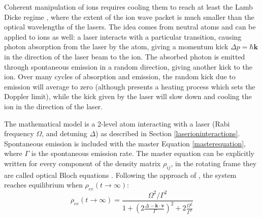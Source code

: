 Coherent manipulation of ions requires cooling them to reach at least the Lamb Dicke regime \cite{Wineland1998}, where the extent of the ion wave packet is much smaller than the optical wavelengths of the lasers. The idea comes from neutral atoms \cite{1975OptCo..13...68H} and can be applied to ions as well: a laser interacts with a particular transition, causing photon absorption from the laser by the atom, giving a momentum kick $\Delta p = \hbar \mathbf{k}$ in the direction of the laser beam to the ion. The absorbed photon is emitted through spontaneous emission in a random direction, giving another kick to the ion. Over many cycles of absorption and emission, the random kick due to emission will average to zero (although presents a heating process which sets the Doppler limit), while the kick given by the laser will slow down and cooling the ion in the direction of the laser. \par
The mathematical model is a 2-level atom interacting with a laser (Rabi frequency $\Omega$, and detuning $\Delta$) as described in Section \ref{laserioninteractions}. Spontaneous emission is included with the master Equation \eqref{masterequation}, where $\Gamma$ is the spontaneous emission rate. The master equation can be explicitly written for every component of the density matrix $\rho_{ij}$, in the rotating frame they are called optical Bloch equations \cite{foot}. Following the approach of \cite{gabriel}, the system reaches equilibrium when $\rho_{ee}(t\to \infty)$:
\begin{equation}
\rho_{ee}(t\to \infty) = \frac{\Omega^2/\Gamma^2}{1 + \left(2\frac{\Delta -\mathbf{k}\cdot \mathbf{v}}{\Gamma}\right)^2 + 2\frac{\Omega^2}{\Gamma^2}}
\end{equation}
